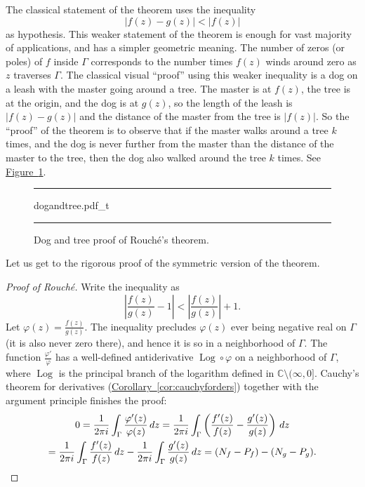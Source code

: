 \documentclass[12pt,openany]{book}
\newcommand{\Log}{\operatorname{Log}}
\newcommand{\sabs}[1]{\lvert {#1} \rvert}
\newcommand{\abs}[1]{\left\lvert {#1} \right\rvert}
\newcommand{\C}{{\mathbb{C}}}
\newcommand{\myquote}[1]{``#1''}
\theoremstyle{plain}
\theoremstyle{remark}
\theoremstyle{definition}
\newenvironment{myfig}{%
\begin{figure}[h!t]
\noindent\rule{\textwidth}{0.5pt}\vspace{12pt}\par\centering}%
{\par\noindent\rule{\textwidth}{0.5pt}
\end{figure}}
\theoremstyle{exercise}
\theoremstyle{example}
\newcommand{\figureref}[1]{\hyperref[#1]{Figure~\ref*{#1}}}
\newcommand{\corref}[1]{\hyperref[#1]{Corollary~\ref*{#1}}}
\begin{document}
The classical statement of the theorem uses the
inequality
\begin{equation*}
\sabs{f(z)-g(z)} < \sabs{f(z)}
\end{equation*}
as hypothesis.
This weaker statement of the theorem is enough for vast majority of
applications, and has a simpler geometric meaning.  The number of zeros (or
poles) of $f$
inside $\Gamma$ corresponds to the number times $f(z)$ winds around zero
as $z$ traverses $\Gamma$.  The classical visual \myquote{proof} using this weaker
inequality is a dog on a leash
with the master going around a tree.  The master is at $f(z)$, the tree is
at the origin, and the dog is at $g(z)$, so the length of the leash is
$\sabs{f(z)-g(z)}$ and the distance of the master from the tree is
$\sabs{f(z)}$.  So the \myquote{proof} of the theorem is to observe that if the
master walks around a tree $k$ times, and the dog is never further from the
master than the distance of the master to the tree, then the dog also walked
around the tree $k$ times.  See \figureref{fig:dogandtree}.

\begin{myfig}
{dogandtree.pdf_t}
\caption{Dog and tree proof of Rouch\'e's theorem.\label{fig:dogandtree}}
\end{myfig}

Let us get to the rigorous proof of the symmetric version of the
theorem.

\begin{proof}[Proof of Rouch\'e]
Write the inequality as
\begin{equation*}
\abs{\frac{f(z)}{g(z)} - 1} <
\abs{\frac{f(z)}{g(z)}} + 1 .
\end{equation*}
Let $\varphi(z) = \frac{f(z)}{g(z)}$.
The inequality precludes $\varphi(z)$ ever being negative real on
$\Gamma$ (it is also never zero there),
and hence it is so in a neighborhood of $\Gamma$.
The function
$\frac{\varphi'}{\varphi}$ has a well-defined antiderivative
$\Log \circ \varphi$ on a neighborhood of $\Gamma$, where $\Log$ is
the principal branch of the logarithm defined in $\C \setminus (\infty,0]$.
Cauchy's theorem for derivatives (\corref{cor:cauchyforders})
together with the argument principle finishes the proof:
\begin{multline*}
0
= \frac{1}{2\pi i} \int_{\Gamma} \frac{\varphi'(z)}{\varphi(z)} \, dz
=
\frac{1}{2\pi i} \int_{\Gamma}
\left( \frac{f'(z)}{f(z)} - \frac{g'(z)}{g(z)} \right) \, dz 
\\
=
\frac{1}{2\pi i} \int_{\Gamma}
\frac{f'(z)}{f(z)} \, dz 
-
\frac{1}{2\pi i} \int_{\Gamma}
\frac{g'(z)}{g(z)} \, dz 
=
(N_f - P_f) - (N_g - P_g) .
\qedhere
\end{multline*}
\end{proof}
\end{document}
